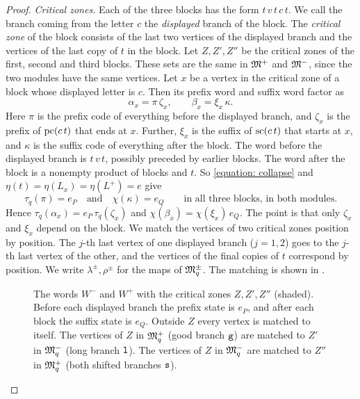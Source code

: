 \begin{proof}
  \emph{Critical zones.}
  Each of the three blocks has the form $t\, v\, t\, c\, t$.
  We call the branch coming from the letter $c$ the \emph{displayed} branch of the block.
  The \emph{critical zone} of the block consists of the last two vertices of the displayed branch and the vertices of the last copy of $t$ in the block.
  Let $Z, Z', Z''$ be the critical zones of the first, second and third blocks.
  These sets are the same in $\mathfrak{M}^{+}$ and $\mathfrak{M}^{-}$, since the two modules have the same vertices.
  Let $x$ be a vertex in the critical zone of a block whose displayed letter is $c$.
  Then its prefix word and suffix word factor as
  \[
    \alpha_x = \pi\, \zeta_x,
    \qquad
    \beta_x = \xi_x\, \kappa.
  \]
  Here $\pi$ is the prefix code of everything before the displayed branch, and $\zeta_x$ is the prefix of $\mathrm{pc}(c\, t)$ that ends at $x$.
  Further, $\xi_x$ is the suffix of $\mathrm{sc}(c\, t)$ that starts at $x$, and $\kappa$ is the suffix code of everything after the block.
  The word before the displayed branch is $t\, v\, t$, possibly preceded by earlier blocks.
  The word after the block is a nonempty product of blocks and $t$.
  So \eqref{equation: collapse} and $\eta(t) = \eta(L_x) = \eta(L^{+}) = e$ give
  \begin{equation}\label{equation: zone states}
    \tau_q(\pi) = e_P \quad\text{and}\quad \chi(\kappa) = e_Q
    \qquad\text{in all three blocks, in both modules.}
  \end{equation}
  Hence $\tau_q(\alpha_x) = e_P\, \tau_q(\zeta_x)$ and $\chi(\beta_x) = \chi(\xi_x)\, e_Q$.
  The point is that only $\zeta_x$ and $\xi_x$ depend on the block.
  We match the vertices of two critical zones position by position.
  The $j$-th last vertex of one displayed branch ($j = 1, 2$) goes to the $j$-th last vertex of the other, and the vertices of the final copies of $t$ correspond by position.
  We write $\lambda^{\pm}, \rho^{\pm}$ for the maps of $\mathfrak{M}^{\pm}_q$.
  The matching is shown in .

  \begin{figure}[t]
    \centering
    
    \caption{The words $W^{-}$ and $W^{+}$ with the critical zones $Z, Z', Z''$ (shaded).
      Before each displayed branch the prefix state is $e_P$, and after each block the suffix state is $e_Q$.
      Outside $Z$ every vertex is matched to itself.
      The vertices of $Z$ in $\mathfrak{M}^{+}_q$ (good branch $\mathtt{g}$) are matched to $Z'$ in $\mathfrak{M}^{-}_q$ (long branch $\mathtt{l}$).
      The vertices of $Z$ in $\mathfrak{M}^{-}_q$ are matched to $Z''$ in $\mathfrak{M}^{+}_q$ (both shifted branches $\mathtt{s}$).}
    \label{figure: reset}
  \end{figure}


\end{proof}
